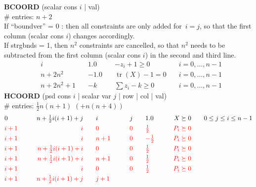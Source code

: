 \documentclass[11pt,a4paper]{article}
\DeclareMathOperator{\tr}{tr}
\theoremstyle{definition}
\begin{document}
{\textbf{BCOORD} (scalar cons $i$ | val) \\
\# entries: $n+2$ \\
{\color{violet} If ``boundver'' = 0 : then all constraints are only added
  for~$i=j$, so that the first column (scalar cons $i$) changes accordingly.} \\
{\color{blue} If strgbnds = 1, then $n^2$ constraints are cancelled, so
  that $n^2$ needs to be subtracted from the first column
  (scalar cons $i$) in the second and third line.}
\[
  \begin{aligned}
    & i \quad & 1.0 \quad & -z_i + 1 \geq 0 \quad & i = 0,\dots,n-1 \\
    & n+2n^2 \quad & -1.0 \quad & \tr(X) - 1 = 0 \quad & i = 0,\dots,n-1
    \\
    & n+2n^2+1 \quad & -k  \quad & \sum z_i - k \geq 0 \quad & i =
    0,\dots,n-1
  \end{aligned}
\]
\textbf{HCOORD} (psd cons $i$ | scalar var $j$ | row | col | val) \\
\# entries: $\tfrac{1}{2}n(n+1)$ {\color{red} $(+n(n+4))$} \\
\[
  \begin{aligned}
    &0 \qquad &n+\tfrac{1}{2}i(i+1)+j \qquad &i \qquad &j \qquad &1.0
    \qquad &X \succeq 0 \qquad &0 \leq j \leq i \leq n-1 \\
    &{\color{red}i+1} \qquad &{\color{red}i} \qquad &{\color{red}0} \qquad
    &{\color{red}0} \qquad &{\color{red}\tfrac{1}{2}} \qquad
    &{\color{red}P_i \succeq 0} \qquad & \\
    &{\color{red}i+1} \qquad &{\color{red}i} \qquad &{\color{red}n+1} \qquad
    &{\color{red}0} \qquad &{\color{red}-\tfrac{1}{2}} \qquad
    &{\color{red}P_i \succeq 0} \qquad &\\
    &{\color{red}i+1} \qquad &{\color{red}n+\tfrac{1}{2}i(i+1)+i} \qquad &{\color{red}0} \qquad
    &{\color{red}0} \qquad &{\color{red}\tfrac{1}{2}} \qquad
    &{\color{red}P_i \succeq 0} \qquad &\\
    &{\color{red}i+1} \qquad &{\color{red}n+\tfrac{1}{2}i(i+1)+i} \qquad &{\color{red}n+1} \qquad
    &{\color{red}0} \qquad &{\color{red}\tfrac{1}{2}} \qquad
    &{\color{red}P_i \succeq 0} \qquad &\\
    &{\color{red}i+1} \qquad &{\color{red}i} \qquad &{\color{red}0} \qquad
    &{\color{red}0} \qquad &{\color{red}\tfrac{1}{2}} \qquad
    &{\color{red}P_i \succeq 0} \qquad &\\
    &{\color{red}i+1} \qquad &{\color{red}n+\tfrac{1}{2}i(i+1)+j} \qquad &{\color{red}j+1} \qquad

\end{aligned}\]}
\end{document}
